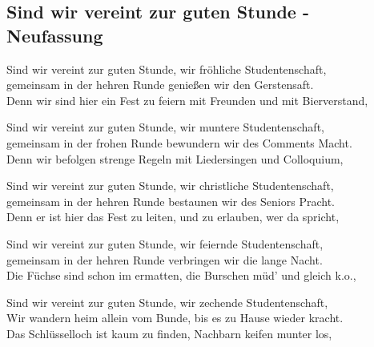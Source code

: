 
\subsection*{Sind wir vereint zur guten Stunde - Neufassung}
%


\thestrophe Sind wir vereint zur guten Stunde, wir fröhliche Studentenschaft, \\
gemeinsam in der hehren Runde genießen wir den Gerstensaft. \\
Denn wir sind hier ein Fest zu feiern mit Freunden und mit Bierverstand, \\

\thestrophe Sind wir vereint zur guten Stunde, wir muntere Studentenschaft, \\
gemeinsam in der frohen Runde bewundern wir des Comments Macht. \\
Denn wir befolgen strenge Regeln mit Liedersingen und Colloquium, \\

\thestrophe Sind wir vereint zur guten Stunde, wir christliche Studentenschaft, \\
gemeinsam in der hehren Runde bestaunen wir des Seniors Pracht. \\
Denn er ist hier das Fest zu leiten, und zu erlauben, wer da spricht, \\

\thestrophe Sind wir vereint zur guten Stunde, wir feiernde Studentenschaft, \\
gemeinsam in der hehren Runde verbringen wir die lange Nacht. \\
Die Füchse sind schon im ermatten, die Burschen müd' und gleich k.o., \\

\thestrophe Sind wir vereint zur guten Stunde, wir zechende Studentenschaft, \\
Wir wandern heim allein vom Bunde, bis es zu Hause wieder kracht. \\
Das Schlüsselloch ist kaum zu finden, Nachbarn keifen munter los, \\
